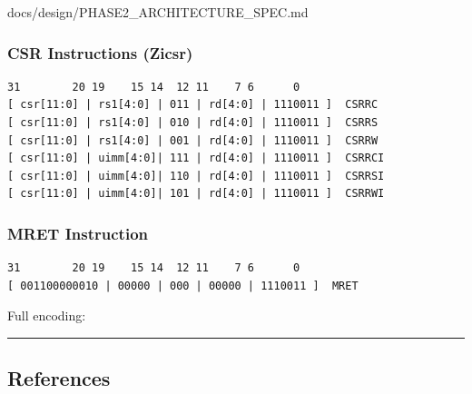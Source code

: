 \begin{relocated}{docs/design/PHASE2_ARCHITECTURE_SPEC.md}
\subsubsection{CSR Instructions (Zicsr)}\label{ds:ch:phase2-architecture:csr-instructions-zicsr}

\begin{lstlisting}[language={}]
31        20 19    15 14  12 11    7 6      0
[ csr[11:0] | rs1[4:0] | 011 | rd[4:0] | 1110011 ]  CSRRC
[ csr[11:0] | rs1[4:0] | 010 | rd[4:0] | 1110011 ]  CSRRS
[ csr[11:0] | rs1[4:0] | 001 | rd[4:0] | 1110011 ]  CSRRW
[ csr[11:0] | uimm[4:0]| 111 | rd[4:0] | 1110011 ]  CSRRCI
[ csr[11:0] | uimm[4:0]| 110 | rd[4:0] | 1110011 ]  CSRRSI
[ csr[11:0] | uimm[4:0]| 101 | rd[4:0] | 1110011 ]  CSRRWI
\end{lstlisting}

\subsubsection{MRET Instruction}\label{ds:ch:phase2-architecture:mret-instruction}

\begin{lstlisting}[language={}]
31        20 19    15 14  12 11    7 6      0
[ 001100000010 | 00000 | 000 | 00000 | 1110011 ]  MRET
\end{lstlisting}

Full encoding: 

\begin{center}\rule{0.5\linewidth}{0.5pt}\end{center}

\subsection{References}\label{ds:ch:phase2-architecture:12-references}


\end{relocated}
